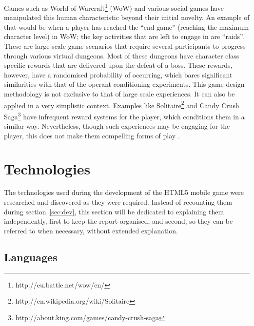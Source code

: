 \documentclass[final]{cmpreport}
\begin{document}
Games such as World of Warcraft\footnote{http://eu.battle.net/wow/en/} (WoW) and various social games have manipulated this human characteristic beyond their initial novelty. An example of that would be when a player has reached the ``end-game'' (reaching the maximum character level) in WoW; the key activities that are left to engage in are ``raids''. These are large-scale game scenarios that require several participants to progress through various virtual dungeons. Most of these dungeons have character class specific rewards that are delivered upon the defeat of a boss. These rewards, however, have a randomised probability of occurring, which bares significant similarities with that of the operant conditioning experiments. This game design methodology is not exclusive to that of large scale experiences. It can also be applied in a very simplistic context. Examples like Solitaire\footnote{http://en.wikipedia.org/wiki/Solitaire} and Candy Crush Saga\footnote{http://about.king.com/games/candy-crush-saga} have infrequent reward systems for the player, which conditions them in a similar way. Nevertheless, though such experiences may be engaging for the player, this does not make them compelling forms of play \cite{ExtraCredits}.

\section{Technologies}
The technologies used during the development of the HTML5 mobile game were researched and discovered as they were required. Instead of recounting them during section~\ref{sec:dev}, this section will be dedicated to explaining them independently, first to keep the report organised, and second, so they can be referred to when necessary, without extended explanation.

\subsection{Languages}
\end{document}
